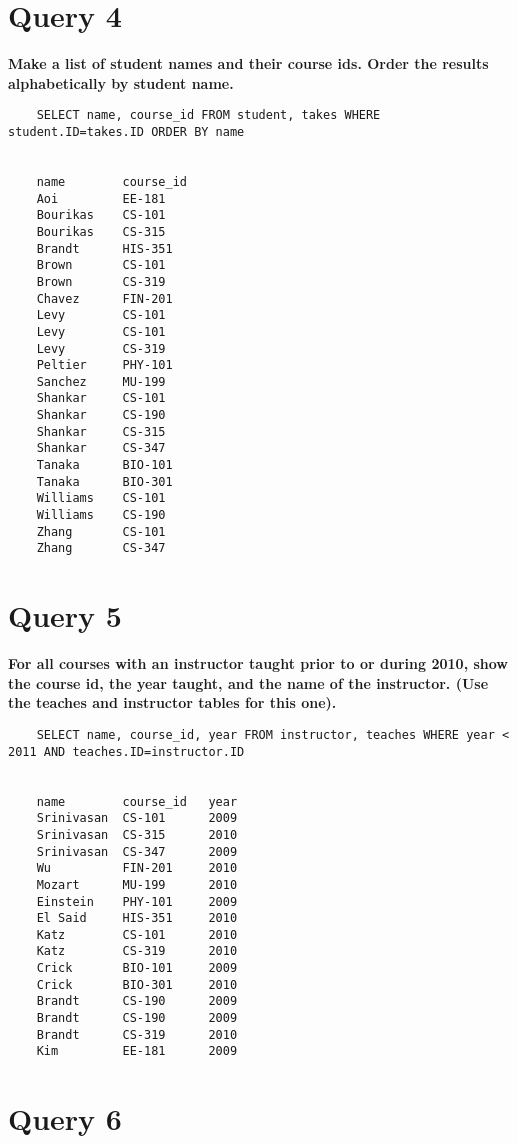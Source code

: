 \documentclass[letterpaper]{article}
\begin{document}
\section{Query 4}

    \textbf{Make a list of student names and their course ids.  Order the results alphabetically by student name.}
    \begin{lstlisting}
    SELECT name, course_id FROM student, takes WHERE student.ID=takes.ID ORDER BY name


    name   	    course_id	
    Aoi	        EE-181	
    Bourikas	CS-101	
    Bourikas	CS-315	
    Brandt      HIS-351	
    Brown       CS-101	
    Brown       CS-319	
    Chavez      FIN-201	
    Levy        CS-101	
    Levy        CS-101	
    Levy        CS-319	
    Peltier     PHY-101	
    Sanchez     MU-199	
    Shankar     CS-101	
    Shankar     CS-190	
    Shankar     CS-315	
    Shankar     CS-347	
    Tanaka      BIO-101	
    Tanaka      BIO-301	
    Williams	CS-101	
    Williams	CS-190	
    Zhang       CS-101	
    Zhang       CS-347
    \end{lstlisting}
        
\section{Query 5}

    \textbf{For all courses with an instructor taught prior to or during 2010, show the course id, the year taught, and the name of the instructor.  (Use the teaches and instructor tables for this one).}
    \begin{lstlisting}
    SELECT name, course_id, year FROM instructor, teaches WHERE year < 2011 AND teaches.ID=instructor.ID


    name	    course_id	year	
    Srinivasan	CS-101   	2009	
    Srinivasan	CS-315   	2010	
    Srinivasan	CS-347   	2009	
    Wu	        FIN-201  	2010	
    Mozart	    MU-199   	2010	
    Einstein	PHY-101    	2009	
    El Said 	HIS-351	    2010
    Katz    	CS-101	    2010
    Katz    	CS-319	    2010
    Crick   	BIO-101	    2009
    Crick   	BIO-301	    2010
    Brandt  	CS-190	    2009
    Brandt  	CS-190	    2009
    Brandt  	CS-319	    2010
    Kim	        EE-181	    2009
    \end{lstlisting}
        
\section{Query 6}
\end{document}
